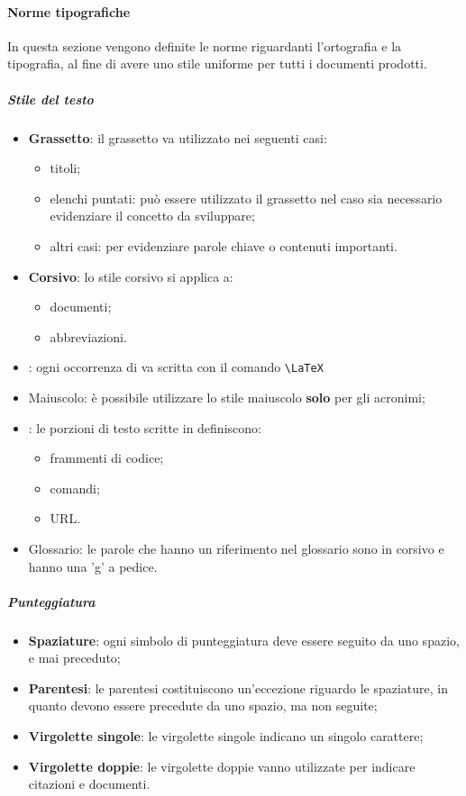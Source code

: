 	\paragraph{Norme tipografiche}
	In questa sezione vengono definite le norme riguardanti l'ortografia e la tipografia, al fine di avere uno stile uniforme per tutti i documenti prodotti.
	\subparagraph{Stile del testo}
		\begin{itemize}
			\item \textbf{Grassetto}: il grassetto va utilizzato nei seguenti casi:
			\begin{itemize}
				\item titoli;
				\item elenchi puntati: può essere utilizzato il grassetto nel caso sia necessario evidenziare il concetto da sviluppare;
				\item altri casi: per evidenziare parole chiave o contenuti importanti.
			\end{itemize}
			\item \textbf{Corsivo}: lo stile corsivo si applica a:
			\begin{itemize}
				\item documenti;
				\item abbreviazioni.
			\end{itemize}
			\item \gl{\LaTeX}: ogni occorrenza di \gl{\LaTeX}{} va scritta con il comando \texttt{\textbackslash LaTeX}
			\item Maiuscolo: è possibile utilizzare lo stile maiuscolo \textbf{solo} per gli acronimi;
			\item {}: le porzioni di testo scritte in  definiscono:
			\begin{itemize}
				\item frammenti di codice;
				\item comandi;
				\item URL.
			\end{itemize} 
			\item Glossario: le parole che hanno un riferimento nel glossario sono in corsivo e hanno una 'g' a pedice.
		\end{itemize}
	\subparagraph{Punteggiatura}
		\begin{itemize}
			\item \textbf{Spaziature}: ogni simbolo di punteggiatura deve essere seguito da uno spazio, e mai preceduto;
			\item \textbf{Parentesi}: le parentesi costituiscono un'eccezione riguardo le spaziature, in quanto devono essere precedute da uno spazio, ma non seguite;
			\item \textbf{Virgolette singole}: le virgolette singole indicano un singolo carattere;
			\item \textbf{Virgolette doppie}: le virgolette doppie vanno utilizzate per indicare citazioni e documenti.
		\end{itemize}
